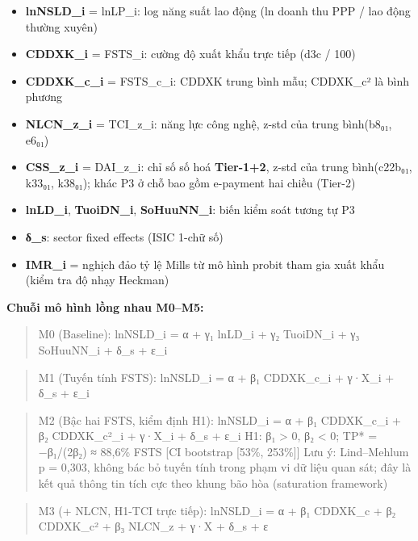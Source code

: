 \documentclass[12pt,a4paper]{article}
\providecommand{\tightlist}{\setlength{\itemsep}{0pt}\setlength{\parskip}{0pt}}
\begin{document}
\begin{itemize}
\tightlist
\item
  \textbf{lnNSLD\_i} = lnLP\_i: log năng suất lao động (ln doanh thu PPP
  / lao động thường xuyên)
\item
  \textbf{CDDXK\_i} = FSTS\_i: cường độ xuất khẩu trực tiếp (d3c / 100)
\item
  \textbf{CDDXK\_c\_i} = FSTS\_c\_i: CDDXK trung bình mẫu; CDDXK\_c² là
  bình phương
\item
  \textbf{NLCN\_z\_i} = TCI\_z\_i: năng lực công nghệ, z-std của trung
  bình(b8₀₁, e6₀₁)
\item
  \textbf{CSS\_z\_i} = DAI\_z\_i: chỉ số số hoá \textbf{Tier-1+2}, z-std
  của trung bình(c22b₀₁, k33₀₁, k38₀₁); khác P3 ở chỗ bao gồm e-payment
  hai chiều (Tier-2)
\item
  \textbf{lnLD\_i}, \textbf{TuoiDN\_i}, \textbf{SoHuuNN\_i}: biến kiểm
  soát tương tự P3
\item
  \textbf{δ\_s}: sector fixed effects (ISIC 1-chữ số)
\item
  \textbf{IMR\_i} = nghịch đảo tỷ lệ Mills từ mô hình probit tham gia
  xuất khẩu (kiểm tra độ nhạy Heckman)
\end{itemize}

\textbf{Chuỗi mô hình lồng nhau M0--M5:}

\begin{quote}
M0 (Baseline): lnNSLD\_i = α + γ₁ lnLD\_i + γ₂ TuoiDN\_i + γ₃ SoHuuNN\_i
+ δ\_s + ε\_i
\end{quote}

\begin{quote}
M1 (Tuyến tính FSTS): lnNSLD\_i = α + β₁ CDDXK\_c\_i + γ·X\_i + δ\_s +
ε\_i
\end{quote}

\begin{quote}
M2 (Bậc hai FSTS, kiểm định H1): lnNSLD\_i = α + β₁ CDDXK\_c\_i + β₂
CDDXK\_c²\_i + γ·X\_i + δ\_s + ε\_i H1: β₁ \textgreater{} 0, β₂
\textless{} 0; TP* = −β₁/(2β₂) ≈ 88,6\% FSTS {[}CI bootstrap {[}53\%,
253\%{]}{]} Lưu ý: Lind--Mehlum p = 0,303, không bác bỏ tuyến tính trong
phạm vi dữ liệu quan sát; đây là kết quả thông tin tích cực theo khung
bão hòa (saturation framework)
\end{quote}

\begin{quote}
M3 (+ NLCN, H1-TCI trực tiếp): lnNSLD\_i = α + β₁ CDDXK\_c + β₂
CDDXK\_c² + β₃ NLCN\_z + γ·X + δ\_s + ε
\end{quote}
\end{document}
